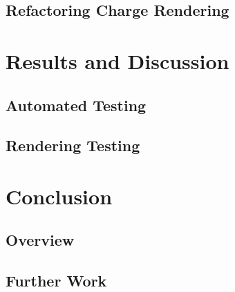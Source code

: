 \documentclass[nobib, a4paper, twoside, justified]{tufte-book}
\begin{document}
\section{Refactoring Charge Rendering}%
\label{sec:refactoring_charge_rendering}

\chapter{Results and Discussion}%
\label{cha:results_and_discussion}

\section{Automated Testing}%
\label{sec:automated_testing}

\section{Rendering Testing}%
\label{sec:rendering_testing}

\chapter{Conclusion}%
\label{cha:conclusion}

\section{Overview}%
\label{sec:overview}

\section{Further Work}%
\label{sec:further_work}



\backmatter%

\printbibliography[heading=bibintoc]

\printglossary%
\label{glossary}


\end{document}
